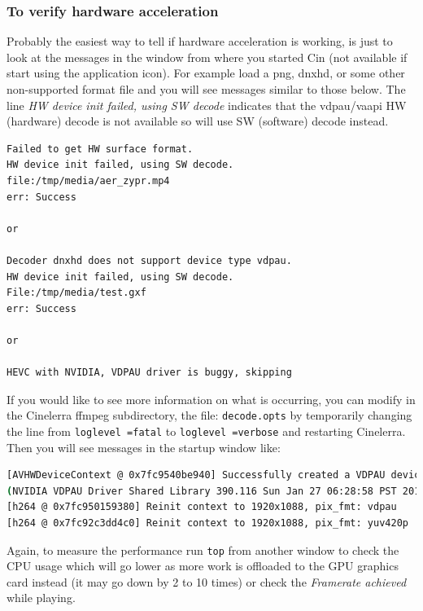 \subsubsection*{To verify hardware acceleration}%
\label{ssub:verify_hardware_acceleration}

Probably the easiest way to tell if hardware acceleration is working, is just to look at the messages in the window from where you started Cin (not available if start using the application icon).  For example load a png, dnxhd, or some other non-supported format file and you will see messages similar to those below.  The line \textit{HW device init failed, using SW decode} indicates that the vdpau/vaapi HW (hardware) decode is not available so will use SW (software) decode instead.

\begin{lstlisting}[language=bash,numbers=none]
Failed to get HW surface format.
HW device init failed, using SW decode.
file:/tmp/media/aer_zypr.mp4
err: Success

or

Decoder dnxhd does not support device type vdpau.
HW device init failed, using SW decode.
File:/tmp/media/test.gxf
err: Success

or

HEVC with NVIDIA, VDPAU driver is buggy, skipping
\end{lstlisting}

If you would like to see more information on what is occurring, you can modify in the Cinelerra ffmpeg subdirectory, the file:  \texttt{decode.opts}   by temporarily changing the line from \texttt{loglevel =fatal} to \texttt{loglevel =verbose} and restarting Cinelerra.  Then you will see messages in the startup window like:

\begin{lstlisting}[language=bash,numbers=none]
[AVHWDeviceContext @ 0x7fc9540be940] Successfully created a VDPAU device 
(NVIDIA VDPAU Driver Shared Library 390.116 Sun Jan 27 06:28:58 PST 2019) on X11 display :0
[h264 @ 0x7fc950159380] Reinit context to 1920x1088, pix_fmt: vdpau
[h264 @ 0x7fc92c3dd4c0] Reinit context to 1920x1088, pix_fmt: yuv420p
\end{lstlisting}

Again, to measure the performance run \texttt{top} from another window to check the CPU usage which will go lower as more work is offloaded to the GPU graphics card instead (it may go down by 2 to 10 times) or check the \textit{Framerate achieved} while playing.

